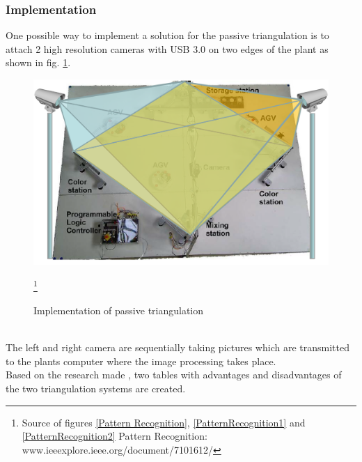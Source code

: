\subsubsection*{Implementation} 
One possible way to implement a solution for the passive triangulation is to attach 2 high resolution cameras with USB 3.0 on two edges of the plant as shown in fig. \ref{ativeTriangulationimplementation}.\\
\begin{figure}[!htbp]
\centering
\includegraphics[width = 16cm]{Pictures/triangulationimplementatio}
\caption{Implementation of passive triangulation}
\label{ativeTriangulationimplementation}
\footnote{Source of figures \ref{Pattern Recognition}, \ref{PatternRecognition1} and \ref{PatternRecognition2}  Pattern Recognition: www.ieeexplore.ieee.org/document/7101612/} 
\end{figure}\\%
The left and right camera are sequentially taking pictures which are transmitted to the plants computer where the image processing takes place.\\ 
\pagebreak
Based on the research made , two tables with advantages and disadvantages of the two triangulation systems are created.
